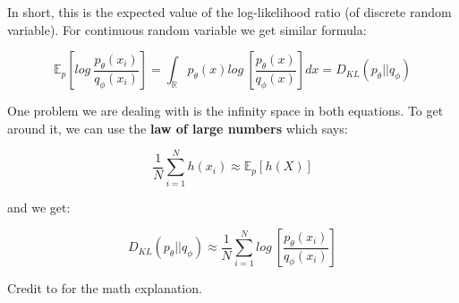 In short, this is the expected value of the log-likelihood ratio (of discrete random variable). For continuous random variable we get similar formula:

\begin{equation}
\label{eq:kl_divergence_continous}
    \mathbb{E}_p [log\ \frac{p_\theta(x_i)}{q_\phi(x_i)}]
    =
    \int_{\mathbb{R}} p_\theta(x) log\ [\frac{p_\theta(x)}{q_\phi(x)}] dx
    =
    D_{KL} (p_\theta || q_\phi)
\end{equation}

One problem we are dealing with is the infinity space in both equations.  To get around it, we can use the \textbf{law of large numbers} which says:

\begin{equation*}
    \frac{1}{N} \sum_{i=1}^N h(x_i) \approx \mathbb{E}_p [h(X)]
\end{equation*}

and we get:

\begin{equation}
    D_{KL} (p_\theta || q_\phi) \approx
    \frac{1}{N} \sum_{i=1}^N log\ [\frac{p_\theta(x_i)}{q_\phi(x_i)}]
\end{equation}

Credit to \cite{dk-divergence-math-explanation} for the math explanation.